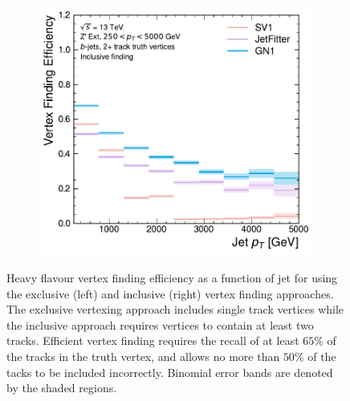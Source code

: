 \begin{figure}[!htbp]
\begin{subfigure}[b]{0.48\textwidth}
        \includegraphics[width=\textwidth]{chapters/gnn_tagger/figs/results/tracks/zprime/zprime_bjet_vert_eff_2+_track_incl.pdf}
    \end{subfigure}
    \caption{
        Heavy flavour vertex finding efficiency as a function of jet \pt for \Zprimebjets using the exclusive (left) and inclusive (right) vertex finding approaches.
        The exclusive vertexing approach includes single track vertices while the inclusive approach requires vertices to contain at least two tracks.
        Efficient vertex finding requires the recall of at least $65\%$ of the tracks in the truth vertex, and allows no more than $50\%$ of the tacks to be included incorrectly.
        Binomial error bands are denoted by the shaded regions.
        }
    \label{fig:zprime_vert_eff}
\end{figure}



